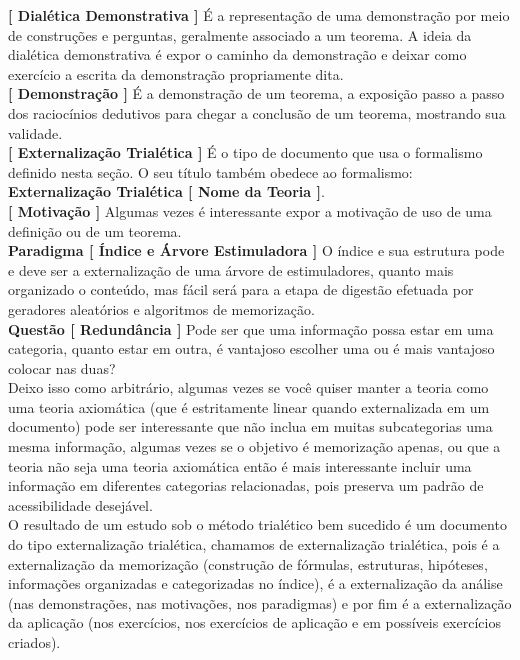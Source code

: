 \textbf{[ Dialética Demonstrativa ]} É a representação de uma demonstração por meio de construções e perguntas, geralmente associado a um teorema. A ideia da dialética demonstrativa é expor o caminho da demonstração e deixar como exercício a escrita da demonstração propriamente dita.  \\

\textbf{[ Demonstração ]} É a demonstração de um teorema, a exposição passo a passo dos raciocínios dedutivos para chegar a conclusão de um teorema, mostrando sua validade.\\

\textbf{[ Externalização Trialética ]} É o tipo de documento que usa o formalismo definido nesta seção. O seu título também obedece ao formalismo: \textbf{Externalização Trialética [ Nome da Teoria ]}.  \\

\textbf{[ Motivação ]} Algumas vezes é interessante expor a motivação de uso de uma definição ou de um teorema.\\

\textbf{Paradigma [ Índice e Árvore Estimuladora ]} O índice e sua estrutura pode e deve ser a externalização de uma árvore de estimuladores, quanto mais organizado o conteúdo, mas fácil será para a etapa de digestão efetuada por geradores aleatórios e algoritmos de memorização.\\

\textbf{Questão [ Redundância ]} Pode ser que uma informação possa estar em uma categoria, quanto estar em outra, é vantajoso escolher uma ou é mais vantajoso colocar nas duas? \\

Deixo isso como arbitrário, algumas vezes se você quiser manter a teoria como uma teoria axiomática (que é estritamente linear quando externalizada em um documento) pode ser interessante que não inclua em muitas subcategorias uma mesma informação, algumas vezes se o objetivo é memorização apenas, ou que a teoria não seja uma teoria axiomática então é mais interessante incluir uma informação em diferentes categorias relacionadas, pois preserva um padrão de acessibilidade desejável.\\

O resultado de um estudo sob o método trialético bem sucedido é um documento do tipo externalização trialética, chamamos de externalização trialética, pois é a externalização da memorização (construção de fórmulas, estruturas, hipóteses, informações organizadas e categorizadas no índice), é a externalização da análise (nas demonstrações, nas motivações, nos paradigmas) e por fim é a externalização da aplicação (nos exercícios, nos exercícios de aplicação e em possíveis exercícios criados).

